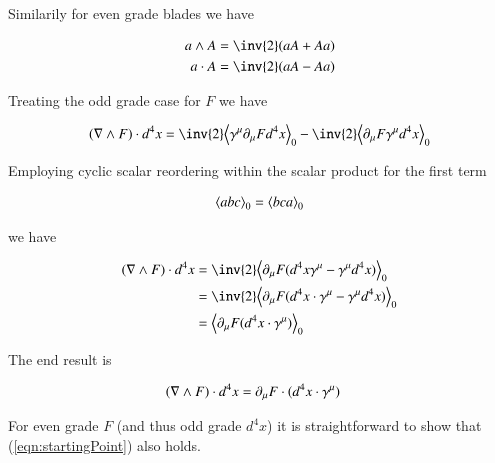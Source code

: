 Similarily for even grade blades we have

\begin{align*}
a \wedge A = \inv{2} (a A + A a) \\
a \cdot A = \inv{2} (a A - A a)
\end{align*}

Treating the odd grade case for $F$ we have

\begin{align*}
( \grad \wedge F ) \cdot d^4 x
&=
\inv{2} \gpgradezero{ \gamma^\mu \partial_\mu F d^4 x } - \inv{2} \gpgradezero{ \partial_\mu F \gamma^\mu d^4 x } \\
\end{align*}

Employing cyclic scalar reordering within the scalar product for the first term

\begin{align}
{\left\langle{{a b c}}\right\rangle}_{0} = {\left\langle{{b c a}}\right\rangle}_{0}
\end{align}

we have

\begin{align*}
( \grad \wedge F ) \cdot d^4 x
&=
\inv{2} \gpgradezero{ \partial_\mu F (d^4 x \gamma^\mu - \gamma^\mu d^4 x)} \\
&=
\inv{2} \gpgradezero{ \partial_\mu F (d^4 x \cdot \gamma^\mu - \gamma^\mu d^4 x)} \\
&=
\gpgradezero{ \partial_\mu F (d^4 x \cdot \gamma^\mu)} \\
\end{align*}

The end result is 

\begin{align}\label{eqn:startingPoint}
( \nabla \wedge F ) \cdot d^4 x &= \partial_\mu F \cdot (d^4 x \cdot \gamma^\mu) 
\end{align}

For even grade $F$ (and thus odd grade $d^4 x$) it is straightforward to show that (\ref{eqn:startingPoint}) also holds.

\EndArticle
